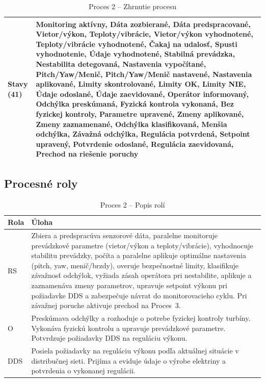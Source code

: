 \documentclass[12pt,a4paper]{article}
\begin{document}
\begin{table}[H]
\begin{tabularx}{\textwidth}{|p{}|X|}
    \hline
    \textbf{Stavy (41)} & Monitoring aktívny, Dáta zozbierané, Dáta predspracované, Vietor/výkon, Teploty/vibrácie, Vietor/výkon vyhodnotené, Teploty/vibrácie vyhodnotené, Čakaj na udalosť, Spusti vyhodnotenie, Údaje vyhodnotené, Stabilná prevádzka, Nestabilita detegovaná, Nastavenia vypočítané, Pitch/Yaw/Menič, Pitch/Yaw/Menič nastavené, Nastavenia aplikované, Limity skontrolované, Limity OK, Limity NIE, Údaje odoslané, Údaje zaevidované, Operátor informovaný, Odchýlka preskúmaná, Fyzická kontrola vykonaná, Bez fyzickej kontroly, Parametre upravené, Zmeny aplikované, Zmeny zaznamenané, Odchýlka klasifikovaná, Menšia odchýlka, Závažná odchýlka, Regulácia potvrdená, Setpoint upravený, Potvrdenie odoslané, Regulácia zaevidovaná, Prechod na riešenie poruchy \\
    \hline
  \end{tabularx}
  \caption{Proces 2 -- Zhrnutie procesu}
\end{table}




\subsection{Procesné roly}
\begin{table}[H]
  \centering
  \renewcommand{\arraystretch}{1.2}
  \begin{tabularx}{\textwidth}{|p{}|X|}
    \hline
    \textbf{Rola} & \textbf{Úloha} \\
    \hline
    RS & Zbiera a predspracúva senzorové dáta, paralelne monitoruje
    prevádzkové parametre (vietor/výkon a teploty/vibrácie), vyhodnocuje stabilitu
    prevádzky, počíta a paralelne aplikuje optimálne nastavenia (pitch, yaw,
    menič/brzdy), overuje bezpečnostné limity, klasifikuje závažnosť odchýlok,
    vyžiada zásah operátora pri nestabilite, aplikuje a zaznamenáva zmeny
    parametrov, upravuje setpoint výkonu pri požiadavke DDS a zabezpečuje
    návrat do monitorovacieho cyklu. Pri závažnej poruche aktivuje prechod
    na Proces~3. \\
    \hline
    O & Preskúmava odchýlky a rozhoduje o potrebe fyzickej
    kontroly turbíny. Vykonáva fyzickú kontrolu a upravuje prevádzkové parametre.
    Potvrdzuje požiadavky DDS na reguláciu výkonu. \\
    \hline
    DDS & Posiela požiadavky na reguláciu výkonu podľa
    aktuálnej situácie v distribučnej sieti. Prijíma a eviduje údaje o výrobe
    elektriny a potvrdenia o vykonanej regulácii. \\
    \hline
  \end{tabularx}
  \caption{Proces 2 -- Popis rolí}
\end{table}
\end{document}
